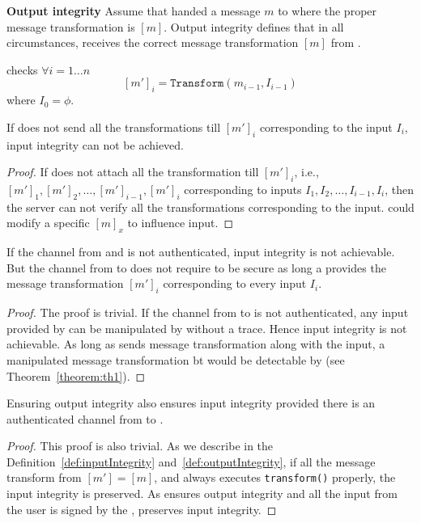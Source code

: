 \begin{definition}{\textbf{Output integrity}}
\label{def:outputIntegrity}
Assume that \server handed a message $m$ to \host where the proper message transformation is $[m]$. Output integrity defines that in all circumstances, \user receives the correct message transformation $[m]$ from \host.
\end{definition}

 \server checks $\forall i=1\ldots n$ $$[m']_i = \texttt{Transform}(m_{i-1}, I_{i-1})$$ where $I_0=\phi$.

\begin{theorem}
\label{theorem:th1}
If \user does not send all the transformations till $[m']_i$ corresponding to the input $I_i$, input integrity can not be achieved. 
\end{theorem}

\begin{proof}
If \user does not attach all the transformation till $[m']_i$, i.e., $[m']_1, [m']_2, \ldots, [m']_{i-1}, [m']_i$  corresponding to inputs $I_1, I_2,\ldots, I_{i-1}, I_i$, then the server can not verify all the transformations corresponding to the input. \host could modify a specific $[m]_x$ to influence \user input.
\end{proof}

\begin{theorem}
\label{theorem:th2}
If the channel from \user and \server is not authenticated, input integrity is not achievable. But the channel from \server to \user does not require to be secure as long a \user provides the message transformation $[m']_i$ corresponding to every input $I_i$.
\end{theorem}

\begin{proof}
The proof is trivial. If the channel from \user to \server is not authenticated, any input provided by \user can be manipulated by \host without a trace. Hence input integrity is not achievable. As long as \user sends message transformation along with the input, a manipulated message transformation bt \host would be detectable by \server (see Theorem~\ref{theorem:th1}).
\end{proof}

\begin{theorem}
\label{theorem:th3}
Ensuring output integrity also ensures input integrity provided there is an authenticated channel from \user to \server.
\end{theorem}

\begin{proof}
This proof is also trivial. As we describe in the Definition~\ref{def:inputIntegrity} and~\ref{def:outputIntegrity}, if all the message transform from \host $[m']=[m]$, and \host always executes \texttt{transform()} properly, the input integrity is preserved. As \name ensures output integrity and all the input from the user is signed by the \device, \name preserves input integrity. 
\end{proof}


